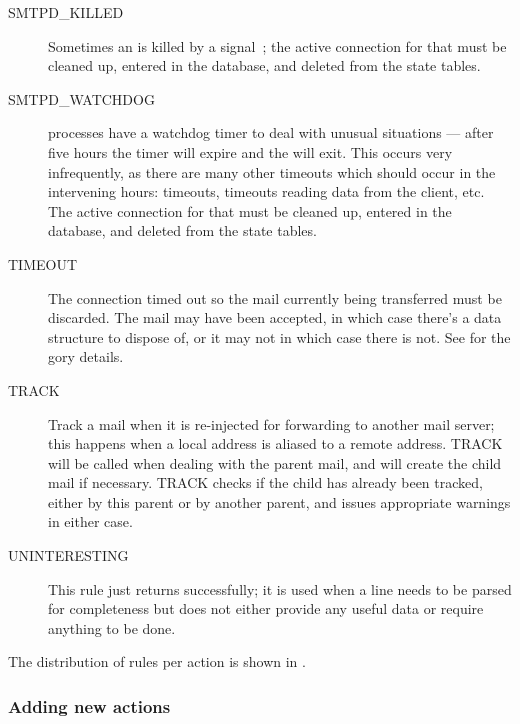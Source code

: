 \begin{description}
    \item [SMTPD\_KILLED] Sometimes an  is killed by a
        signal~\cite{Wikipedia-unix-signals}; the active connection for
        that  must be cleaned up, entered in the database,
        and deleted from the state tables.

    \item [SMTPD\_WATCHDOG]  processes have a watchdog timer
        to deal with unusual situations --- after five hours the timer will
        expire and the  will exit.  This occurs very
        infrequently, as there are many other timeouts which should occur
        in the intervening hours: \DNS{} timeouts, timeouts reading data
        from the client, etc\@.  The active connection for that
         must be cleaned up, entered in the database, and
        deleted from the state tables.

    \item [TIMEOUT] The connection timed out so the mail currently being
        transferred must be discarded. The mail may have been accepted, in
        which case there's a data structure to dispose of, or it may not in
        which case there is not.  See
         for the gory details.

    \item [TRACK] Track a mail when it is re-injected for forwarding to
        another mail server; this happens when a local address is aliased
        to a remote address.  TRACK will be called when dealing with the
        parent mail, and will create the child mail if necessary. TRACK
        checks if the child has already been tracked, either by this parent
        or by another parent, and issues appropriate warnings in either
        case.

    \item [UNINTERESTING] This rule just returns successfully; it is used when a
        line needs to be parsed for completeness but does not either
        provide any useful data or require anything to be done.

\end{description}

The distribution of rules per action is shown in .


\subsubsection{Adding new actions}

